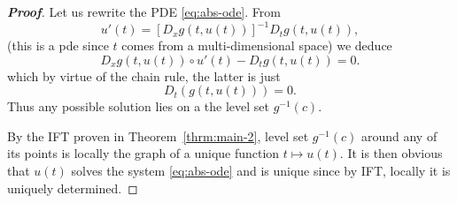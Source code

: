 \documentclass[10pt,a4paper]{amsart}
\begin{document}
\begin{proof}[\footnotesize \textbf{Proof}]
\par Let us rewrite the PDE \ref{eq:abs-ode}. From
\[
u'(t) = \left[D_xg(t,u(t))\right]^{-1} D_tg(t,u(t)),
\]
(this is a pde since $t$ comes from a multi-dimensional space)
we deduce
\[
D_xg(t,u(t))\circ u'(t) - D_tg(t,u(t)) = 0.
\]
which by virtue of the chain rule, the latter is just
\[
D_t\left( g(t,u(t))  \right) = 0.
\]
Thus any possible solution lies on a the level set $g^{-1}(c)$. 

\par By the IFT proven in Theorem~\ref{thrm:main-2}, level set $g^{-1}(c)$ around any of its points is locally the graph of a unique function $t \mapsto u(t)$. It is then obvious that $u(t)$ solves the system \eqref{eq:abs-ode} and is unique since by IFT, locally it is uniquely determined. 
\end{proof}
\end{document}
